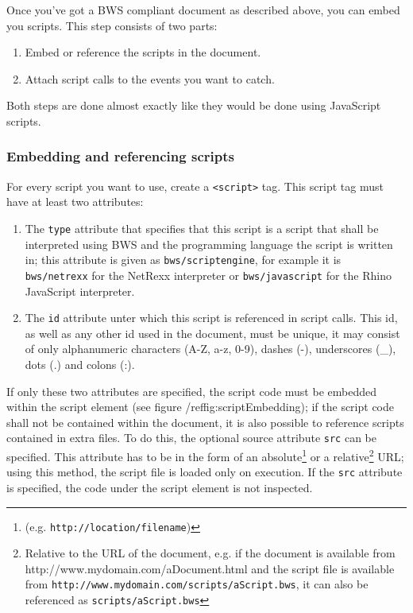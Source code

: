 Once you've got a BWS compliant document as described above, you can embed you scripts. This step consists of two parts: 

\begin{enumerate}

\item Embed or reference the scripts in the document.

\item Attach script calls to the events you want to catch.

\end{enumerate}

Both steps are done almost exactly like they would be done using JavaScript scripts.

\subsubsection{Embedding and referencing scripts}

For every script you want to use, create a \texttt{<script>} tag. This script tag must have at least two attributes:

\begin{enumerate}

\item The \texttt{type} attribute that specifies that this script is a script that shall be interpreted using BWS and the programming language the script is written in; this attribute is given as \texttt{bws/scriptengine}, for example it is \texttt{bws/netrexx} for the NetRexx interpreter or \texttt{bws/javascript} for the Rhino JavaScript interpreter.

\item The \texttt{id} attribute unter which this script is referenced in script calls. This id, as well as any other id used in the document, must be unique, it may consist of only alphanumeric characters (A-Z, a-z, 0-9), dashes (-), underscores (\_), dots (.) and colons (:).

\end{enumerate}

If only these two attributes are specified, the script code must be embedded within the script element (see figure /ref{fig:scriptEmbedding}); if the script code shall not be contained within the document, it is also possible to reference scripts contained in extra files. To do this, the optional source attribute \texttt{src} can be specified. This attribute has to be in the form of an absolute\footnote{(e.g. \texttt{http://location/filename})} or a relative\footnote{Relative to the URL of the document, e.g. if the document is available from http://www.mydomain.com/aDocument.html and the script file is available from \texttt{http://www.mydomain.com/scripts/aScript.bws}, it can also be referenced as \texttt{scripts/aScript.bws}} URL; using this method, the script file is loaded only on execution. If the \texttt{src} attribute is specified, the code under the script element is not inspected.


